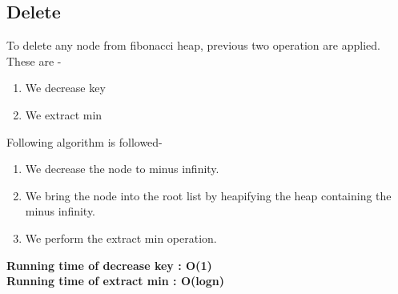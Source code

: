 \documentclass[14pt,a4paper]{report}
\begin{document}
\subsection{Delete}
To delete any node from fibonacci heap, previous two operation are applied. These are -\\
\begin{enumerate}
    \item We decrease key
    \item We extract min
\end{enumerate}
Following algorithm is followed-\\
\begin{enumerate}
    \item We decrease the node to minus infinity.
    \item We bring the node into the root list by heapifying the heap containing the minus infinity.
    \item We perform the extract min operation.
\end{enumerate}
\textbf{Running time of decrease key : O(1)}\\
\textbf{Running time of extract min : O(logn)}\\ \\
\end{document}
